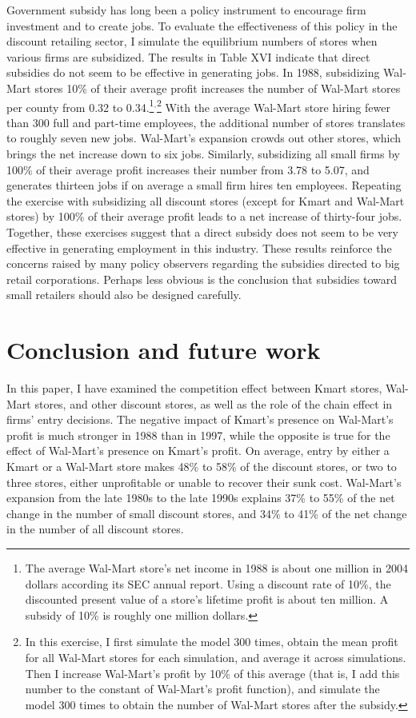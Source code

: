 \documentclass[notitlepage,onecolumn,11pt]{article}
\begin{document}
Government subsidy has long been a policy instrument to encourage firm
investment and to create jobs. To evaluate the effectiveness of this policy
in the discount retailing sector, I simulate the equilibrium numbers of
stores when various firms are subsidized. The results in Table XVI indicate
that direct subsidies do not seem to be effective in generating jobs. In
1988, subsidizing Wal-Mart stores 10\% of their average profit increases the
number of Wal-Mart stores per county from 0.32 to 0.34.\footnote{%
The average Wal-Mart store's net income in 1988 is about one million in 2004
dollars according its SEC annual report. Using a discount rate of 10\%, the
discounted present value of a store's lifetime profit is about ten million.
A subsidy of 10\% is roughly one million dollars.}$^{,}$\footnote{%
In this exercise, I first simulate the model 300 times, obtain the mean
profit for all Wal-Mart stores for each simulation, and average it across
simulations. Then I increase Wal-Mart's profit by 10\% of this average (that
is, I add this number to the constant of Wal-Mart's profit function), and
simulate the model 300 times to obtain the number of Wal-Mart stores after
the subsidy.} With the average Wal-Mart store hiring fewer than 300 full and
part-time employees, the additional number of stores translates to roughly
seven new jobs. Wal-Mart's expansion crowds out other stores, which brings
the net increase down to six jobs. Similarly, subsidizing all small firms by
100\% of their average profit increases their number from 3.78 to 5.07, and
generates thirteen jobs if on average a small firm hires ten employees.
Repeating the exercise with subsidizing all discount stores (except for
Kmart and Wal-Mart stores) by 100\% of their average profit leads to a net
increase of thirty-four jobs. Together, these exercises suggest that a
direct subsidy does not seem to be very effective in generating employment
in this industry. These results reinforce the concerns raised by many policy
observers regarding the subsidies directed to big retail corporations.
Perhaps less obvious is the conclusion that subsidies toward small retailers
should also be designed carefully.

\section{Conclusion and future work}

In this paper, I have examined the competition effect between Kmart stores,
Wal-Mart stores, and other discount stores, as well as the role of the chain
effect in firms' entry decisions. The negative impact of Kmart's presence on
Wal-Mart's profit is much stronger in 1988 than in 1997, while the opposite
is true for the effect of Wal-Mart's presence on Kmart's profit. On average,
entry by either a Kmart or a Wal-Mart store makes 48\% to 58\% of the
discount stores, or two to three stores, either unprofitable or unable to
recover their sunk cost. Wal-Mart's expansion from the late 1980s to the
late 1990s explains 37\% to 55\% of the net change in the number of small
discount stores, and 34\% to 41\% of the net change in the number of all
discount stores.
\end{document}
